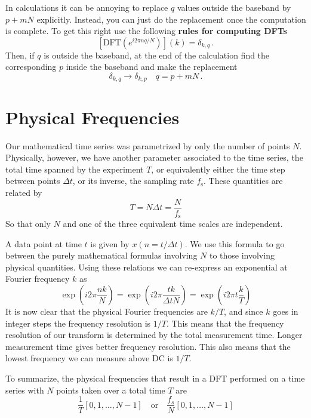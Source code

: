 In calculations it can be annoying to replace $q$ values outside the baseband by $p+mN$ explicitly.
Instead, you can just do the replacement once the computation is complete.
To get this right use the following \textbf{rules for computing DFTs}
\begin{equation}
\left[ \textrm{DFT}\left( e^{i2\pi nq/N} \right)\right](k) = \delta_{k,q} \, .
\end{equation}
Then, if $q$ is outside the baseband, at the end of the calculation find the corresponding $p$ inside the baseband and make the replacement
\begin{equation}
\delta_{k,q} \rightarrow \delta_{k,p} \quad q=p+mN \, . \label{eq:aliasReplacement}
\end{equation}


\section{Physical Frequencies}

Our mathematical time series was parametrized by only the number of points $N$. Physically, however, we have another parameter associated to the time series, the total time spanned by the experiment $T$, or equivalently either the time step between points $\Delta t$, or its inverse, the sampling rate $f_{\textrm{s}}$. These quantities are related by
\begin{displaymath}
T = N\Delta t = \frac{N}{f_{\textrm{s}}}
\end{displaymath}
So that only $N$ and one of the three equivalent time scales are independent.

A data point at time $t$ is given by $x(n=t/\Delta t)$. We use this formula to go between the purely mathematical formulas involving $N$ to those involving physical quantities. Using these relations we can re-express an exponential at Fourier frequency $k$ as
\begin{displaymath}
\exp \left(i2\pi\frac{nk}{N}\right) = \exp\left(i 2 \pi \frac{tk}{\Delta t N} \right) = \exp \left( i 2\pi t\frac{k}{T} \right)
\end{displaymath}
It is now clear that the physical Fourier frequencies are $k/T$, and since $k$ goes in integer steps the frequency resolution is $1/T$. This means that the frequency resolution of our transform is determined by the total measurement time. Longer measurement time gives better frequency resolution. This also means that the lowest frequency we can measure above DC is $1/T$.

To summarize, the physical frequencies that result in a DFT performed on a time series with $N$ points taken over a total time $T$ are
\begin{displaymath}
\frac{1}{T}\left[0,1,\ldots,N-1\right]\quad\textrm{or}\quad\frac{f_{s}}{N}\left[0,1,\ldots,N-1\right]
\end{displaymath}

